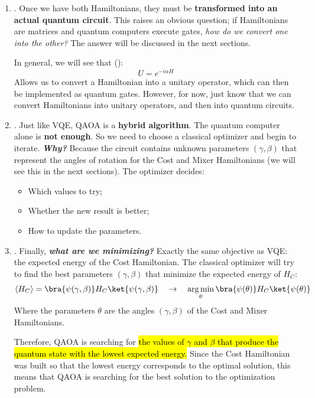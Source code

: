 \begin{enumerate}
    
    \item {}. Once we have both Hamiltonians, they must be \textbf{transformed into an actual quantum circuit}. This raises an obvious question; if Hamiltonians are matrices and quantum computers execute gates, \emph{how do we convert one into the other?} The answer will be discussed in the next sections.
    
    In general, we will see that ():
    \begin{equation*}
        U = e^{-i \alpha H}
    \end{equation*}
    Allows us to convert a Hamiltonian into a unitary operator, which can then be implemented as quantum gates. However, for now, just know that we can convert Hamiltonians into unitary operators, and then into quantum circuits.


    \item {}. Just like VQE, QAOA is a \textbf{hybrid algorithm}. The quantum computer alone is \textbf{not enough}. So we need to choose a classical optimizer and begin to iterate. \emph{\textbf{Why?}} Because the circuit contains unknown parameters $(\gamma, \beta)$ that represent the angles of rotation for the Cost and Mixer Hamiltonians (we will see this in the next sections). The optimizer decides:
    \begin{itemize}
        \item Which values to try;
        \item Whether the new result is better;
        \item How to update the parameters.
    \end{itemize}
    

    \item {}. Finally, \emph{\textbf{what are we minimizing?}} Exactly the same objective as VQE: the expected energy of the Cost Hamiltonian. The classical optimizer will try to find the best parameters $(\gamma, \beta)$ that minimize the expected energy of $H_C$:
    \begin{equation*}
        \langle H_C \rangle = \bra{\psi(\gamma, \beta)} H_C \ket{\psi(\gamma, \beta)}
        \quad
        \to
        \quad
        \argmin_{\theta} \bra{\psi(\theta)} H_C \ket{\psi(\theta)}
    \end{equation*}
    Where the parameters $\theta$ are the angles $(\gamma, \beta)$ of the Cost and Mixer Hamiltonians.

    Therefore, QAOA is searching for \hl{the values of $\gamma$ and $\beta$ that produce the quantum state with the lowest expected energy.} Since the Cost Hamiltonian was built so that the lowest energy corresponds to the optimal solution, this means that QAOA is searching for the best solution to the optimization problem.
\end{enumerate}
